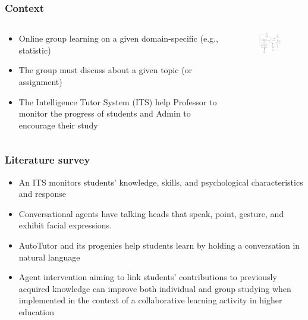 \documentclass{beamer}
\begin{document}
\begin{frame}
\frametitle{Context}
\begin{columns}
	\begin{column}{.5\textwidth}
		\begin{itemize}
			\item Online group learning on a given domain-specific (e.g., statistic)
			\item The group must discuss about a given topic (or assignment)
			\item The Intelligence Tutor System (ITS) help Professor to monitor the progress of students and Admin to encourage their study
		\end{itemize}
	\end{column}
	\begin{column}{.5\textwidth}
\begin{figure}
	\includegraphics[width=45mm]{se1.png}
\end{figure}
\end{column}
\end{columns}

\end{frame}
\begin{frame}
\frametitle{Literature survey}
\begin{itemize}
	\item An ITS monitors  students' knowledge, skills, and psychological
	characteristics  and response \cite{Sottilare}
	\item Conversational agents have talking heads that
	speak, point, gesture, and exhibit facial expressions.
\cite{Johnson2016}
	
	\item AutoTutor and its progenies \cite{Graesser2016} help students learn by holding a conversation in natural language
	\item Agent intervention aiming to link students' contributions to previously acquired knowledge can improve both individual and group studying when implemented in the context of a collaborative learning activity in higher education \cite {Tegos}
\end{itemize}
\end{frame}
\end{document}
